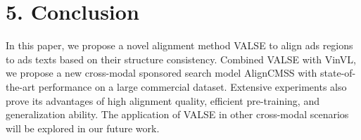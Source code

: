 \documentclass[letterpaper]{article} \usepackage{aaai24}  \usepackage{times}  \usepackage{helvet}  \usepackage{courier}  \usepackage[hyphens]{url}  \usepackage{graphicx} \urlstyle{rm} \def\UrlFont{\rm}  \usepackage{natbib}  \usepackage{caption} \frenchspacing  \setlength{\pdfpagewidth}{8.5in}  \setlength{\pdfpageheight}{11in}
\begin{document}
\section{5. Conclusion}

In this paper, we propose a novel alignment method VALSE to align ads regions to ads texts based on their structure consistency. Combined VALSE with VinVL, we propose a new cross-modal sponsored search model AlignCMSS with state-of-the-art performance on a large commercial dataset. Extensive experiments also prove its advantages of high alignment quality, efficient pre-training, and generalization ability. The application of VALSE in other cross-modal scenarios will be explored in our future work.



\end{document}
